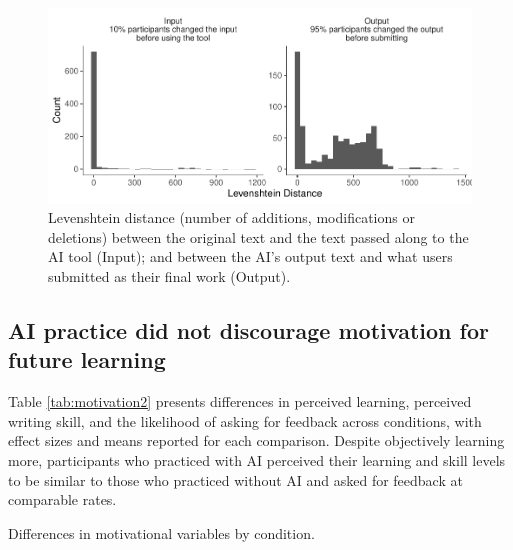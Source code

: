 \documentclass[11pt]{report}
\begin{document}
\begin{append}
\begin{figure}
    \centering
    \includegraphics[width=0.95\linewidth]{levenshtein_distance.pdf}
    \caption{Levenshtein distance (number of additions, modifications or deletions) between the original text and the text passed along to the AI tool (Input); and between the AI's output text and what users submitted as their final work (Output).}
    \label{fig:distance}
\end{figure}

\FloatBarrier
\subsection{AI practice did not discourage motivation for future learning}\label{sec:future_learning2}

Table \ref{tab:motivation2} presents differences in perceived learning, perceived writing skill, and the likelihood of asking for feedback across conditions, with effect sizes and means reported for each comparison. Despite objectively learning more, participants who practiced with AI perceived their learning and skill levels to be similar to those who practiced without AI and asked for feedback at comparable rates.

\begin{table}[h]
    \centering
    \footnotesize
    \caption{Differences in motivational variables by condition.}


\end{table}
\end{append}
\end{document}
